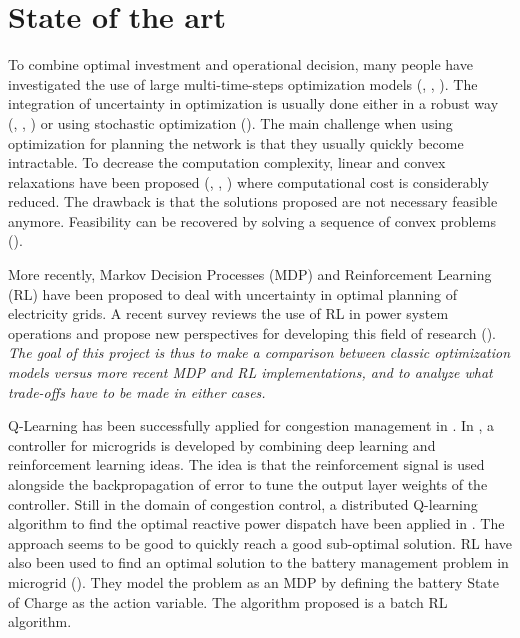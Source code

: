 \section{State of the art}
\label{sec:stateart}

To combine optimal investment and operational decision, many people have investigated the use of large multi-time-steps optimization models (\cite{zonal_int}, \cite{Baker2012OptimalIO}, \cite{paolone}).
The integration of uncertainty in optimization is usually done either in a robust way (\cite{LorcaSun}, \cite{adaptative}, \cite{BM2}) or using stochastic optimization (\cite{Oren}).
The main challenge when using optimization for planning the network is that they usually quickly become intractable.
To decrease the computation complexity, linear and convex relaxations have been proposed (\cite{Farivar_Relax1}, \cite{Farivar_Relax2}, \cite{BM1}) where computational cost is considerably reduced.
The drawback is that the solutions proposed are not necessary feasible anymore.
Feasibility can be recovered by solving a sequence of convex problems (\cite{Nali}).

More recently, Markov Decision Processes (MDP) and Reinforcement Learning (RL) have been proposed to deal with uncertainty in optimal planning of electricity grids.
A recent survey reviews the use of RL in power system operations and propose new perspectives for developing this field of research (\cite{RLSurvey}).
\emph{The goal of this project is thus to make a comparison between classic optimization
models versus more recent MDP and RL implementations, and to analyze what trade-offs
have to be made in either cases.}

Q-Learning has been successfully applied for congestion management in \cite{ZARRABIAN2016179}.
In \cite{fuzzy}, a controller for microgrids is developed by combining deep learning and reinforcement learning ideas.
The idea is that the reinforcement signal is used alongside the backpropagation of error to tune the output layer weights of the controller.
Still in the domain of congestion control, a distributed Q-learning algorithm to find the optimal reactive power dispatch have been applied in \cite{volt_control}.
The approach seems to be good to quickly reach a good sub-optimal solution.
RL have also been used to find an optimal solution to the battery management problem in microgrid (\cite{Battery}).
They model the problem as an MDP by defining the battery State of Charge as the action variable.
The algorithm proposed is a batch RL algorithm.

